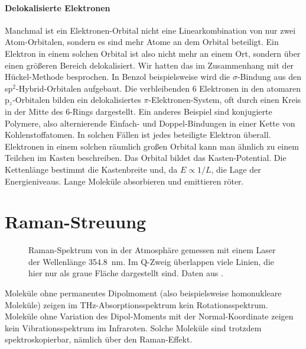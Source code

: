 \paragraph{Delokalisierte Elektronen} Manchmal ist ein Elektronen-Orbital nicht eine Linearkombination von nur zwei Atom-Orbitalen, sondern es sind mehr Atome an dem Orbital beteiligt. Ein Elektron in einem solchen Orbital ist also nicht mehr an einem Ort, sondern über einen größeren Bereich delokalisiert. Wir hatten das im Zusammenhang mit der Hückel-Methode besprochen. In Benzol beispielsweise wird die $\sigma$-Bindung aus den sp$^2$-Hybrid-Orbitalen aufgebaut. Die verbleibenden 6 Elektronen in den atomaren p$_z$-Orbitalen bilden ein delokalisiertes $\pi$-Elektronen-System, oft durch einen Kreis in der Mitte des 6-Rings dargestellt. Ein anderes Beispiel sind konjugierte Polymere, also alternierende Einfach- und Doppel-Bindungen in einer Kette von Kohlenstoffatomen. In solchen Fällen ist jedes beteiligte Elektron überall. Elektronen in einem solchen räumlich großen Orbital kann man ähnlich zu einem Teilchen im Kasten beschreiben. Das Orbital bildet das Kasten-Potential. Die Kettenlänge bestimmt die Kastenbreite und, da $E \propto 1 /L$, die Lage der Energieniveaus. Lange Moleküle absorbieren und emittieren röter.




\section{Raman-Streuung}

\begin{figure}
\caption{Raman-Spektrum von  in der Atmosphäre gemessen mit einem Laser der Wellenlänge 354.8~nm. Im Q-Zweig überlappen viele Linien, die hier nur als graue Fläche dargestellt sind. Daten aus \cite{Liu14_OE_N2}. }
\end{figure}




Moleküle ohne permanentes Dipolmoment (also beispielsweise homonukleare Moleküle) zeigen im THz-Absorptionsspektrum kein Rotationsspektrum. Moleküle ohne  Variation des Dipol-Moments mit der Normal-Koordinate zeigen kein Vibrationsspektrum im Infraroten. Solche
Moleküle sind trotzdem spektroskopierbar, nämlich über den Raman-Effekt.

